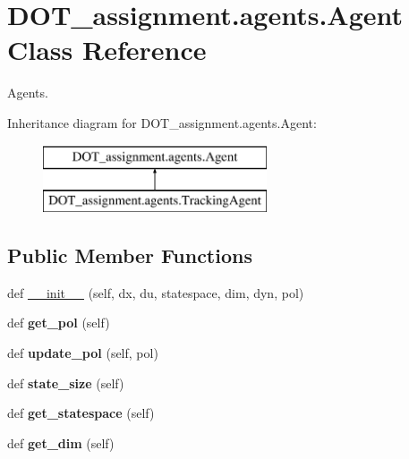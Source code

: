 \hypertarget{class_d_o_t__assignment_1_1agents_1_1_agent}{}\section{D\+O\+T\+\_\+assignment.\+agents.\+Agent Class Reference}
\label{class_d_o_t__assignment_1_1agents_1_1_agent}


Agents.  


Inheritance diagram for D\+O\+T\+\_\+assignment.\+agents.\+Agent\+:\begin{figure}[H]
\begin{center}
\leavevmode
\includegraphics[height=2.000000cm]{class_d_o_t__assignment_1_1agents_1_1_agent}
\end{center}
\end{figure}
\subsection*{Public Member Functions}
\begin{DoxyCompactItemize}
\item 
def \mbox{\hyperlink{class_d_o_t__assignment_1_1agents_1_1_agent_a243feb66a55d2a2733464276db763fc3}{\+\_\+\+\_\+init\+\_\+\+\_\+}} (self, dx, du, statespace, dim, dyn, pol)
\item 
\mbox{\label{class_d_o_t__assignment_1_1agents_1_1_agent_af718808f9100549cdd31fbc0b48e06f0}} 
def {\bfseries get\+\_\+pol} (self)
\item 
\mbox{\label{class_d_o_t__assignment_1_1agents_1_1_agent_a85c6b89b354a7ae61b6838b180cebe60}} 
def {\bfseries update\+\_\+pol} (self, pol)
\item 
\mbox{\label{class_d_o_t__assignment_1_1agents_1_1_agent_a3cfc67e386fda93a867174e900a9aeb0}} 
def {\bfseries state\+\_\+size} (self)
\item 
\mbox{\label{class_d_o_t__assignment_1_1agents_1_1_agent_ac6bd8df21ff8033da03e945e461e35ca}} 
def {\bfseries get\+\_\+statespace} (self)
\item 
\mbox{\label{class_d_o_t__assignment_1_1agents_1_1_agent_aa1e9d1f9f704c4016f62d907e0650877}} 
def {\bfseries get\+\_\+dim} (self)
\end{DoxyCompactItemize}
